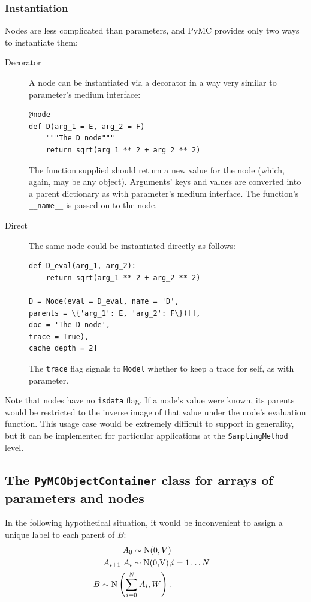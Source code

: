 \documentclass[]{book}
\begin{document}
\subsubsection{Instantiation}
Nodes are less complicated than parameters, and PyMC provides only two ways to instantiate them:
\begin{description}
    \item[Decorator] A node can be instantiated via a decorator in a way very similar to parameter's medium interface:
\begin{verbatim}
@node
def D(arg_1 = E, arg_2 = F)
    """The D node"""
    return sqrt(arg_1 ** 2 + arg_2 ** 2)
\end{verbatim}
The function supplied should return a new value for the node (which, again, may be any object). Arguments' keys and values are converted into a parent dictionary as with parameter's medium interface. The function's \texttt{\_\_name\_\_} is passed on to the node.
    \item[Direct] The same node could be instantiated directly as follows:
\begin{verbatim}
def D_eval(arg_1, arg_2):
    return sqrt(arg_1 ** 2 + arg_2 ** 2)

D = Node(eval = D_eval, name = 'D',
parents = \{'arg_1': E, 'arg_2': F\})[],
doc = 'The D node',
trace = True),
cache_depth = 2]
\end{verbatim}
The \texttt{trace} flag signals to \texttt{Model} whether to keep a trace for self, as with parameter.
\end{description}
Note that nodes have no \texttt{isdata} flag. If a node's value were known, its parents would be restricted to the inverse image of that value under the node's evaluation function. This usage case would be extremely difficult to support in generality, but it can be implemented for particular applications at the \texttt{SamplingMethod} level.

\subsection{The \texttt{PyMCObjectContainer} class for arrays of parameters and nodes}\label{sub:container}
In the following hypothetical situation, it would be inconvenient to assign a unique label to each parent of $B$:
\begin{eqnarray*}
	A_0 \sim \textup N(0,V)\\
	A_{i+1}|A_i\sim\textup{N(0,V)},&i=1\ldots N\\
	B \sim \textup N\left(\sum_{i=0}^N A_i,W\right).
\end{eqnarray*}
\end{document}
